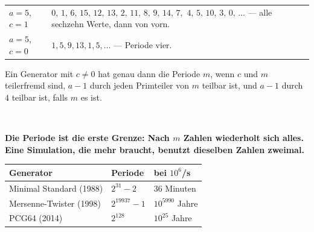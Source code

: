 \begin{merksatz}
\begin{center}
{\small
\renewcommand{\arraystretch}{1.5}
\begin{tabular}{@{}P{2.2cm}P{6.4cm}@{}}
\toprule
$a=5$, $c=1$ & $0,\,1,\,6,\,15,\,12,\,13,\,2,\,11,\,8,\,9,\,14,\,7,$ $4,\,5,\,10,\,3,\,0,\,\ldots$ --- alle sechzehn Werte, dann von vorn.\\
$a=5$, $c=0$ & $1, 5, 9, 13, 1, 5, \ldots$ --- Periode vier.\\
\bottomrule
\end{tabular}}
\end{center}

Ein Generator mit $c \ne 0$ hat genau dann die Periode $m$, wenn $c$ und $m$ teilerfremd sind, $a-1$ durch jeden Primteiler von $m$ teilbar ist, und $a-1$ durch $4$ teilbar ist, falls $m$ es ist.

 \checkmark \ 

\begin{center}
\begin{minipage}{0.9\textwidth}
\textbf{Die Periode ist die erste Grenze: Nach $m$ Zahlen wiederholt sich alles. Eine Simulation, die mehr braucht, benutzt dieselben Zahlen zweimal.}
\end{minipage}
\end{center}

\begin{center}
{\small
\renewcommand{\arraystretch}{1.48}
\begin{tabular}{@{}P{3.6cm}P{2.6cm}P{2.4cm}@{}}
\toprule
\textbf{Generator} & \textbf{Periode} & \textbf{bei $10^{6}$/s}\\
\midrule
Minimal Standard (1988) & $2^{31}-2$ & $36$ Minuten\\
Mersenne-Twister (1998) & $2^{19937}-1$ & $10^{5990}$ Jahre\\
PCG64 (2014) & $2^{128}$ & $10^{25}$ Jahre\\
\bottomrule
\end{tabular}}
\end{center}

\begin{center}
\begin{minipage}{0.88\textwidth}
\end{minipage}
\end{center}
\end{merksatz}

